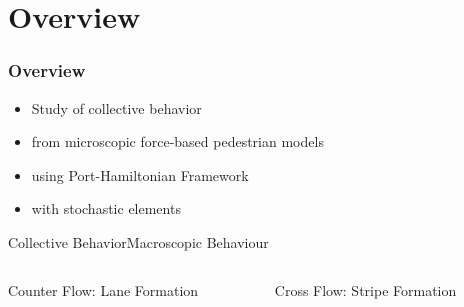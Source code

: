 \section{Overview}

\begin{frame}
    \frametitle{Overview}
    \begin{itemize}
        \item Study of collective behavior
        \item from microscopic force-based pedestrian models
        \item using Port-Hamiltonian Framework
        \item with stochastic elements
    \end{itemize}
\end{frame}
    
    



\begin{frame}{Collective Behavior}{Macroscopic Behaviour}
    \begin{columns}[t]
\begin{column}{0.48\linewidth}
    \centering
    Counter Flow: \linebreak Lane Formation \linebreak \linebreak
\end{column}
\begin{column}{0.48\linewidth}
    \centering
    Cross Flow: \linebreak Stripe Formation \linebreak \linebreak
\end{column}
    \end{columns}    
\end{frame}

